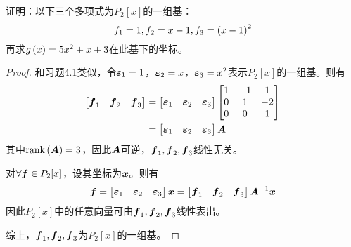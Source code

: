 \begin{problem}
证明：以下三个多项式为\(P_2[x]\)的一组基：
\begin{equation*}
    f_1=1,f_2=x-1,f_3=\left( x-1 \right)^2
\end{equation*}
再求\(g\left( x \right)=5x^2+x+3\)在此基下的坐标。
\end{problem}
\begin{proof}
    和习题4.1类似，令\(\boldsymbol{\varepsilon}_1=1\)，\(\boldsymbol{\varepsilon}_2=x\)，\(\boldsymbol{\varepsilon}_3=x^2\)表示\(P_2[x]\)的一组基。则有
    \begin{align*}
        \begin{bmatrix}
            \boldsymbol{f}_1 & \boldsymbol{f}_2 & \boldsymbol{f}_3
        \end{bmatrix}
         & =
        \begin{bmatrix}
            \boldsymbol{\varepsilon}_1 & \boldsymbol{\varepsilon}_2 & \boldsymbol{\varepsilon}_3
        \end{bmatrix}
        \begin{bmatrix}
            1 & -1 & 1  \\
            0 & 1  & -2 \\
            0 & 0  & 1
        \end{bmatrix} \\
         & =
        \begin{bmatrix}
            \boldsymbol{\varepsilon}_1 & \boldsymbol{\varepsilon}_2 & \boldsymbol{\varepsilon}_3
        \end{bmatrix}\boldsymbol{A}
    \end{align*}
    其中\(\mathrm{rank}\left( \boldsymbol{A} \right)=3\)，因此\(\boldsymbol{A}\)可逆，\(\boldsymbol{f}_1,\boldsymbol{f}_2,\boldsymbol{f}_3\)线性无关。

    对\(\forall\boldsymbol{f}\in P_2[x]\)，设其坐标为\(\boldsymbol{x}\)。则有
    \begin{equation*}
        \boldsymbol{f}=
        \begin{bmatrix}
            \boldsymbol{\varepsilon}_1 & \boldsymbol{\varepsilon}_2 & \boldsymbol{\varepsilon}_3
        \end{bmatrix}\boldsymbol{x}=
        \begin{bmatrix}
            \boldsymbol{f}_1 & \boldsymbol{f}_2 & \boldsymbol{f}_3
        \end{bmatrix}{\boldsymbol{A}}^{-1}\boldsymbol{x}
    \end{equation*}
    因此\(P_2[x]\)中的任意向量可由\(\boldsymbol{f}_1,\boldsymbol{f}_2,\boldsymbol{f}_3\)线性表出。

    综上，\(\boldsymbol{f}_1,\boldsymbol{f}_2,\boldsymbol{f}_3\)为\(P_2[x]\)的一组基。
\end{proof}

